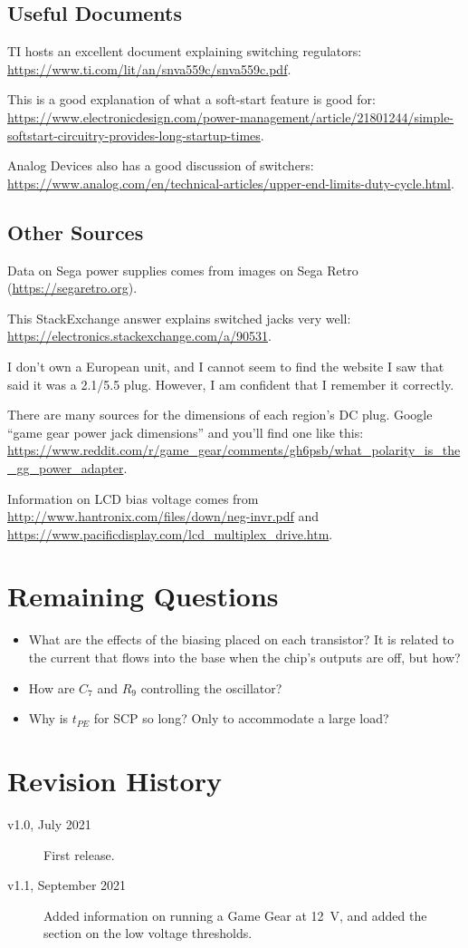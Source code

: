 \documentclass{article}
\begin{document}
\subsection{Useful Documents}
TI hosts an excellent document explaining switching regulators:
\url{https://www.ti.com/lit/an/snva559c/snva559c.pdf}.

This is a good explanation of what a soft-start feature is good for:
\url{https://www.electronicdesign.com/power-management/article/21801244/simple-softstart-circuitry-provides-long-startup-times}.

Analog Devices also has a good discussion of switchers:
\url{https://www.analog.com/en/technical-articles/upper-end-limits-duty-cycle.html}.

\subsection{Other Sources}
\label{sec:other_sources}
Data on Sega power supplies comes from images on Sega Retro
(\url{https://segaretro.org}).

This Stack\-Ex\-change answer explains switched jacks very well:
\url{https://electronics.stackexchange.com/a/90531}.

I don't own a European unit, and I cannot seem to find the website I
saw that said it was a 2.1/5.5 plug. However, I am confident that I
remember it correctly.

There are many sources for the dimensions of each region's DC
plug. Google ``game gear power jack dimensions'' and you'll find one
like this:
\url{https://www.reddit.com/r/game_gear/comments/gh6psb/what_polarity_is_the_gg_power_adapter}.

Information on LCD bias voltage comes from
\url{http://www.hantronix.com/files/down/neg-invr.pdf} and
\url{https://www.pacificdisplay.com/lcd_multiplex_drive.htm}.
\section{Remaining Questions}
\label{sec:remaining_questions}
\begin{itemize}
\item What are the effects of the biasing placed on each transistor?
  It is related to the current that flows into the base when the
  chip's outputs are off, but how?
\item How are $C_7$ and $R_9$ controlling the oscillator?
\item Why is $t_{PE}$ for SCP so long? Only to accommodate a large load?
\end{itemize}

\section{Revision History}
\begin{description}
\item[v1.0, July 2021] First release.
\item[v1.1, September 2021] Added information on running a Game Gear
  at \qty{12}{\volt}, and added the section on the low voltage thresholds.
\end{description}
\end{document}
